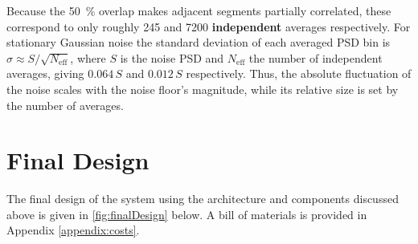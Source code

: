  Because the \SI{50}{\percent} overlap makes adjacent segments partially correlated, these correspond to only roughly 245 and \num{7200} \textbf{independent} averages respectively. For stationary Gaussian noise the standard deviation of each averaged PSD bin is $\sigma \approx S/\sqrt{N_{\mathrm{eff}}}$, where $S$ is the noise PSD and $N_{\mathrm{eff}}$ the number of independent averages, giving $0.064\,S$ and $0.012\,S$ respectively. Thus, the absolute fluctuation of the noise scales with the noise floor's magnitude, while its relative size is set by the number of averages.
 
\section{Final Design}
The final design of the system using the architecture and components discussed above is given in \autoref{fig:finalDesign} below. A bill of materials is provided in Appendix \ref{appendix:costs}.

